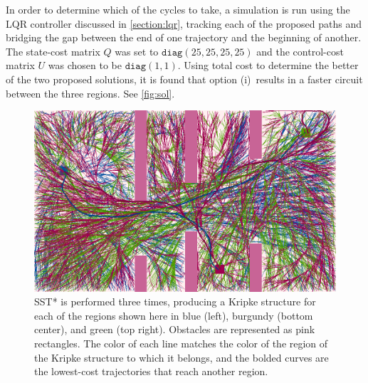 In order to determine which of the cycles to take, a simulation is run using the LQR controller discussed in \autoref{section:lqr}, tracking each of the proposed paths and bridging the gap between the end of one trajectory and the beginning of another. The state-cost matrix $Q$ was set to $\texttt{diag}(25, 25, 25, 25)$ and the control-cost matrix $U$ was chosen to be $\texttt{diag}(1, 1)$. Using total cost to determine the better of the two proposed solutions, it is found that option (i)\ results in a faster circuit between the three regions. See \autoref{fig:sol}.


\begin{figure}
    \centering
    \includegraphics[scale=0.61]{./figures/doubleint2.png}
    \caption[Double Integrator Example --- Three Trees using SST*]{SST* is performed three times, producing a Kripke structure for each of the regions shown here in blue (left), burgundy (bottom center), and green (top right). Obstacles are represented as pink rectangles. The color of each line matches the color of the region of the Kripke structure to which it belongs, and the bolded curves are the lowest-cost trajectories that reach another region.} 
    \label{fig:all_trees}
\end{figure}

